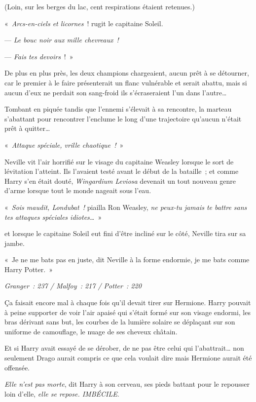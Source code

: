 (Loin, sur les berges du lac, cent respirations étaient retenues.)

«~\emph{Arcs-en-ciels et licornes}~! rugit le capitaine Soleil.

--- \emph{Le bouc noir aux mille chevreaux~!}

--- \emph{Fais tes devoirs}~!~»

De plus en plus près, les deux champions chargeaient, aucun prêt à se détourner, car le premier à le faire présenterait un flanc vulnérable et serait abattu, mais si aucun d'eux ne perdait son sang-froid ils s'écraseraient l'un dans l'autre…

Tombant en piquée tandis que l'ennemi s'élevait à sa rencontre, la marteau s'abattant pour rencontrer l'enclume le long d'une trajectoire qu'aucun n'était prêt à quitter…

«~\emph{Attaque spéciale, vrille chaotique~!}~»

Neville vit l'air horrifié sur le visage du capitaine Weasley lorsque le sort de lévitation l'atteint. Ils l'avaient testé avant le début de la bataille~; et comme Harry s'en était douté, \emph{Wingardium Leviosa} devenait un tout nouveau genre d'arme lorsque tout le monde nageait sous l'eau.

«~\emph{Sois maudit, Londubat~!} piailla Ron Weasley, \emph{ne peux-tu jamais te battre sans tes attaques spéciales idiotes…}~»

et lorsque le capitaine Soleil eut fini d'être incliné sur le côté, Neville tira sur sa jambe.

«~Je ne me bats pas en juste, dit Neville à la forme endormie, je me bats comme Harry Potter.~»

\emph{Granger~: 237 / Malfoy~: 217 / Potter~: 220}

\later

Ça faisait encore mal à chaque fois qu'il devait tirer sur Hermione. Harry pouvait à peine supporter de voir l'air apaisé qui s'était formé sur son visage endormi, les bras dérivant sans but, les courbes de la lumière solaire se déplaçant sur son uniforme de camouflage, le nuage de ses cheveux châtain.

Et si Harry avait essayé de se dérober, de ne pas être celui qui l'abattrait… non seulement Drago aurait compris ce que cela voulait dire mais Hermione aurait été offensée.

\emph{Elle n'est pas morte}, dit Harry à son cerveau, ses pieds battant pour le repousser loin d'elle, \emph{elle se repose. IMBÉCILE}.

